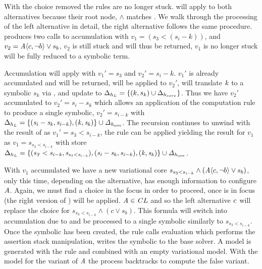 With the choice removed the rules are no longer stuck.  will
apply to both alternatives because their root node, $\wedge$ matches
\boolFuncs{}. We walk through the processing of the left alternative in detail,
the right alternative follows the same procedure.  produces two
calls to accumulation with $v_{1} = (s_{3} < (s_{i} - k))$, and $v_{2} =
\chc[A]{c,\neg b} \vee s_{b}$, $v_{2}$ is still stuck and will thus be returned,
$v_{1}$ is no longer stuck will be fully reduced to a symbolic term.

Accumulation will apply  with $v_{1}' = s_{3}$ and $v_{2}' = s_{i}
- k$. $v_{1}'$ is already accumulated and will be returned, 
will be applied to $v_{2}'$, will translate $\mathit{k}$ to a symbolic $s_{k}$ via
, and update  to $\Delta_{h_{L}} = \{(k, s_{k})
\cup \Delta_{h_{core}}\}$. Thus we have $v_{2}'$ accumulated to $v_{2}' = s_{i}
- s_{k}$ which allows an application of the computation rule 
to produce a single symbolic, $v_{2}' = s_{i-k}$ with $\Delta_{h_{L}} =
\mathit{\{(s_{i} - s_{k}, s_{i-k}), (k,s_{k})\} \cup \Delta_{h_{core}}}$. The
recursion continues to unwind with the result of  as $v_{1}' =
s_{3} < s_{i-k}$, the rule  can be applied yielding the result
for $v_{1}$ as $v_{1} = s_{s_{3}<s_{i-k}}$ with store $\Delta_{h_{L}} =
\mathit{\{(s_{3} < s_{i-k}, s_{s_{3}<s_{i-k}}), (s_{i} - s_{k}, s_{i-k}),
  (k,s_{k})\} \cup \Delta_{h_{core}}}$.

With $v_{1}$ accumulated we have a new variational core $s_{s_{3}<s_{i-k}} \wedge
(\chc[A]{c, \neg b} \vee s_{b})$, only this time, depending on the alternative,
\configuration{} has enough information to configure $\mathit{A}$. Again, we must
find a choice in the focus in order to proceed, once  is in
focus  (the right version of ) will be applied.
$\mathit{A} \in \mathit{C}{L}$ and so the left alternative $\mathit{c}$ will replace
the choice for $s_{s_{3}<s_{i-k}} \wedge (c \vee s_{b})$. This formula will
switch into accumulation due to  and be processed to a single
symbolic similarly to $s_{s_{3}<s_{i-k}}$. Once the symbolic has been created,
the  rule calls evaluation which performs the assertion stack
manipulation, writes the symbolic to the base solver. A model is generated with
the  rule and combined with an empty variational model. With the
model for the \true{} variant of $\mathit{A}$ the process backtracks to compute the
false variant.